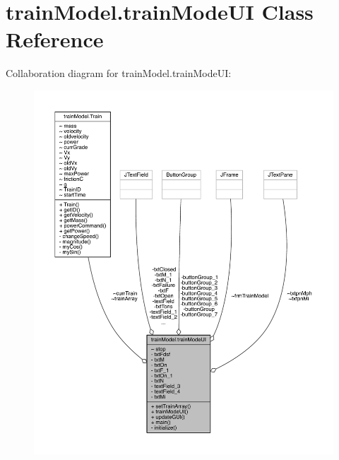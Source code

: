 \hypertarget{classtrainModel_1_1trainModeUI}{}\section{train\+Model.\+train\+Mode\+UI Class Reference}
\label{classtrainModel_1_1trainModeUI}


Collaboration diagram for train\+Model.\+train\+Mode\+UI\+:
\nopagebreak
\begin{figure}[H]
\begin{center}
\leavevmode
\includegraphics[width=350pt]{classtrainModel_1_1trainModeUI__coll__graph}
\end{center}
\end{figure}

